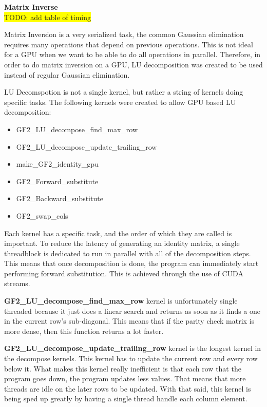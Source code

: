 \documentclass[conference]{IEEEtran}
\begin{document}
            
            
            
        \textbf{Matrix Inverse}\label{Matrix Inverse}\\
        \colorbox{yellow}{TODO: add table of timing}
            
        Matrix Inversion is a very serialized task, the common Gaussian elimination requires many operations that depend on previous operations. This is not ideal for a GPU when we want to be able to do all operations in parallel. Therefore, in order to do matrix inversion on a GPU, LU decomposition was created to be used instead of regular Gaussian elimination.
            
        LU Decomspotion is not a single kernel, but rather a string of kernels doing specific tasks. The following kernels were created to allow GPU based LU decomposition:
        \begin{itemize}
            \item GF2\_LU\_decompose\_find\_max\_row
            \item GF2\_LU\_decompose\_update\_trailing\_row 
            \item make\_GF2\_identity\_gpu
            \item GF2\_Forward\_substitute
            \item GF2\_Backward\_substitute
            \item GF2\_swap\_cols
        \end{itemize}

        Each kernel has a specific task, and the order of which they are called is important. To reduce the latency of generating an identity matrix, a single threadblock is dedicated to run in parallel with all of the decomposition steps. This means that once decomposition is done, the program can immediately start performing forward substitution. This is achieved through the use of CUDA streams.
        
        
        \textbf{GF2\_LU\_decompose\_find\_max\_row} kernel is unfortunately single threaded because it just does a linear search and returns as soon as it finds a one in the current row's sub-diagonal. This means that if the parity check matrix is more dense, then this function returns a lot faster. 
        
        
        \textbf{GF2\_LU\_decompose\_update\_trailing\_row } kernel is the longest kernel in the decompose kernels. This kernel has to update the current row and every row below it. What makes this kernel really inefficient is that each row that the program goes down, the program updates less values. That means that more threads are idle on the later rows to be updated. With that said, this kernel is being sped up greatly by having a single thread handle each column element.
        
\end{document}
